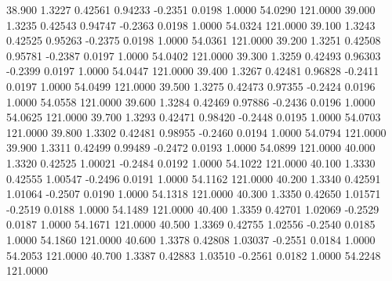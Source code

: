   38.900   1.3227   0.42561   0.94233  -0.2351   0.0198   1.0000  54.0290 121.0000
  39.000   1.3235   0.42543   0.94747  -0.2363   0.0198   1.0000  54.0324 121.0000
  39.100   1.3243   0.42525   0.95263  -0.2375   0.0198   1.0000  54.0361 121.0000
  39.200   1.3251   0.42508   0.95781  -0.2387   0.0197   1.0000  54.0402 121.0000
  39.300   1.3259   0.42493   0.96303  -0.2399   0.0197   1.0000  54.0447 121.0000
  39.400   1.3267   0.42481   0.96828  -0.2411   0.0197   1.0000  54.0499 121.0000
  39.500   1.3275   0.42473   0.97355  -0.2424   0.0196   1.0000  54.0558 121.0000
  39.600   1.3284   0.42469   0.97886  -0.2436   0.0196   1.0000  54.0625 121.0000
  39.700   1.3293   0.42471   0.98420  -0.2448   0.0195   1.0000  54.0703 121.0000
  39.800   1.3302   0.42481   0.98955  -0.2460   0.0194   1.0000  54.0794 121.0000
  39.900   1.3311   0.42499   0.99489  -0.2472   0.0193   1.0000  54.0899 121.0000
  40.000   1.3320   0.42525   1.00021  -0.2484   0.0192   1.0000  54.1022 121.0000
  40.100   1.3330   0.42555   1.00547  -0.2496   0.0191   1.0000  54.1162 121.0000
  40.200   1.3340   0.42591   1.01064  -0.2507   0.0190   1.0000  54.1318 121.0000
  40.300   1.3350   0.42650   1.01571  -0.2519   0.0188   1.0000  54.1489 121.0000
  40.400   1.3359   0.42701   1.02069  -0.2529   0.0187   1.0000  54.1671 121.0000
  40.500   1.3369   0.42755   1.02556  -0.2540   0.0185   1.0000  54.1860 121.0000
  40.600   1.3378   0.42808   1.03037  -0.2551   0.0184   1.0000  54.2053 121.0000
  40.700   1.3387   0.42883   1.03510  -0.2561   0.0182   1.0000  54.2248 121.0000
